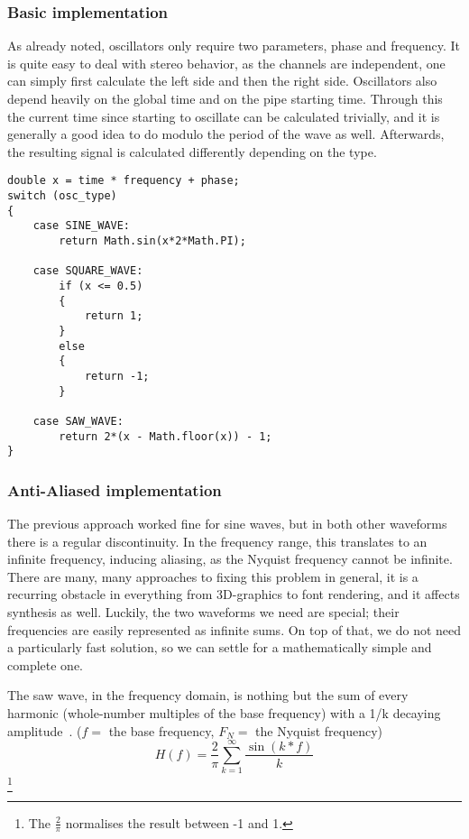 \documentclass[11pt,a4paper]{article}
\begin{document}
\subsubsection{Basic implementation}

As already noted, oscillators only require two parameters, phase and frequency. It is quite easy to deal with stereo behavior, as the channels are independent, one can simply first calculate the left side and then the right side. Oscillators also depend heavily on the global time and on the pipe starting time. Through this the current time since starting to oscillate can be calculated trivially, and it is generally a good idea to do modulo the period of the wave as well. Afterwards, the resulting signal is calculated differently depending on the type.
\\\begin{minipage}{\linewidth}
\begin{lstlisting}
double x = time * frequency + phase;
switch (osc_type)
{
	case SINE_WAVE:
		return Math.sin(x*2*Math.PI);

	case SQUARE_WAVE:
		if (x <= 0.5)
		{
		    return 1;
		}
		else
		{
		    return -1;
		}

	case SAW_WAVE:
		return 2*(x - Math.floor(x)) - 1;
}
\end{lstlisting}
\end{minipage}

\subsubsection{Anti-Aliased implementation}

The previous approach worked fine for sine waves, but in both other waveforms there is a regular discontinuity. In the frequency range, this translates to an infinite frequency, inducing aliasing, as the Nyquist frequency cannot be infinite.
There are many, many approaches to fixing this problem in general, it is a recurring obstacle in everything from 3D-graphics to font rendering, and it affects synthesis as well. Luckily, the two waveforms we need are special; their frequencies are easily represented as infinite sums. On top of that, we do not need a particularly fast solution, so we can settle for a mathematically simple and complete one.

The saw wave, in the frequency domain, is nothing but the sum of every harmonic (whole-number multiples of the base frequency) with a 1/k decaying amplitude~\cite{WolframSaw}.
(\(f = \) the base frequency, \(F_N = \) the Nyquist frequency)
\begin{equation}
H(f) = \frac{2}{\pi}\sum\limits_{k=1}^\infty{\frac{\sin(k*f)}{k}}
\end{equation}
\footnote{The \(\frac{2}{\pi}\) normalises the result between -1 and 1.}
\end{document}

